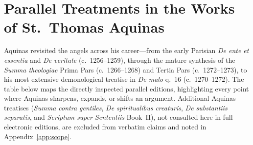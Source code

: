 \section{Parallel Treatments in the Works of St.~Thomas Aquinas}
\label{app:aquinas-parallels}

Aquinas revisited the angels across his career---from the early Parisian \emph{De ente et essentia} and \emph{De veritate} (c.~1256--1259), through the mature synthesis of the \emph{Summa theologiae} Prima Pars (c.~1266--1268) and Tertia Pars (c.~1272--1273), to his most extensive demonological treatise in \emph{De malo} q.~16 (c.~1270--1272). The table below maps the directly inspected parallel editions, highlighting every point where Aquinas sharpens, expands, or shifts an argument. Additional Aquinas treatises (\emph{Summa contra gentiles}, \emph{De spiritualibus creaturis}, \emph{De substantiis separatis}, and \emph{Scriptum super Sententiis} Book~II), not consulted here in full electronic editions, are excluded from verbatim claims and noted in Appendix~\ref{app:scope}.

